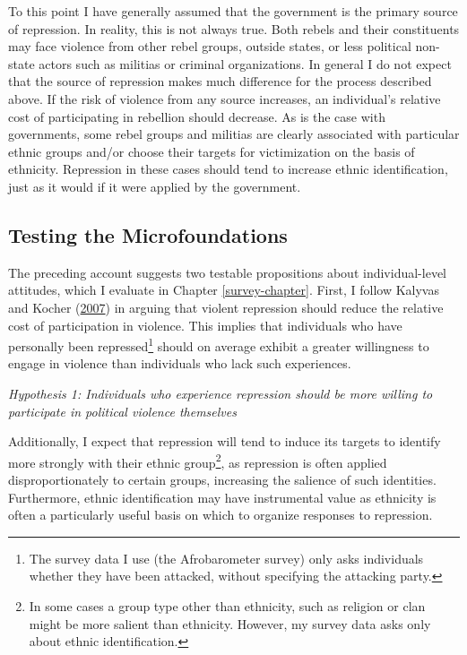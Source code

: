 \documentclass[12pt,]{book}
\let\rmarkdownfootnote\footnote%
\def\footnote{\protect\rmarkdownfootnote}
\theoremstyle{definition}
\theoremstyle{definition}
\theoremstyle{definition}
\theoremstyle{remark}
\begin{document}
To this point I have generally assumed that the government is the
primary source of repression. In reality, this is not always true. Both
rebels and their constituents may face violence from other rebel groups,
outside states, or less political non-state actors such as militias or
criminal organizations. In general I do not expect that the source of
repression makes much difference for the process described above. If the
risk of violence from any source increases, an individual's relative
cost of participating in rebellion should decrease. As is the case with
governments, some rebel groups and militias are clearly associated with
particular ethnic groups and/or choose their targets for victimization
on the basis of ethnicity. Repression in these cases should tend to
increase ethnic identification, just as it would if it were applied by
the government.

\hypertarget{testing-the-microfoundations}{%
\subsection{Testing the
Microfoundations}\label{testing-the-microfoundations}}

The preceding account suggests two testable propositions about
individual-level attitudes, which I evaluate in Chapter
\ref{survey-chapter}. First, I follow Kalyvas and Kocher
(\protect\hyperlink{ref-Kalyvas2007}{2007}) in arguing that violent
repression should reduce the relative cost of participation in violence.
This implies that individuals who have personally been
repressed\footnote{The survey data I use (the Afrobarometer survey) only
  asks individuals whether they have been attacked, without specifying
  the attacking party.} should on average exhibit a greater willingness
to engage in violence than individuals who lack such experiences.

\emph{Hypothesis 1: Individuals who experience repression should be more
willing to participate in political violence themselves}

Additionally, I expect that repression will tend to induce its targets
to identify more strongly with their ethnic group\footnote{In some cases
  a group type other than ethnicity, such as religion or clan might be
  more salient than ethnicity. However, my survey data asks only about
  ethnic identification.}, as repression is often applied
disproportionately to certain groups, increasing the salience of such
identities. Furthermore, ethnic identification may have instrumental
value as ethnicity is often a particularly useful basis on which to
organize responses to repression.
\end{document}
